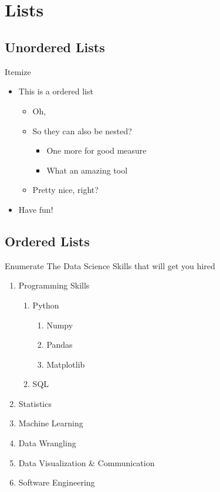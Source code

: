 \documentclass[aspectratio=169,envcountsect]{beamer}    %
\newcommand*{\TocSplit}{9}
\newcommand{\OstToc}[1][]{
	\IfInteger{\TocSplit}
	{
		\tikzmath{integer \nextsection; \nextsection = \TocSplit+1;}
		\begin{columns}[t]
			\begin{column}{0.5\textwidth}
				\tableofcontents[sections=1-\TocSplit, #1]
			\end{column}
			\begin{column}{0.49\textwidth}
				\tableofcontents[sections=\nextsection-, #1]
			\end{column}
		\end{columns}
	}
	{\tableofcontents}
}
\begin{document}
\frame[plain]{\titlepage}

\section*{\contentsname}
\begin{frame}
 \OstToc{}
\end{frame}

\section{Lists}
\subsection{Unordered Lists}
\begin{frame}{Itemize}
 \begin{itemize}
  \item This is a ordered list
        \begin{itemize}
         \item Oh,
         \item So they can also be nested?
               \begin{itemize}
                \item One more for good measure
                \item What an amazing tool
               \end{itemize}
         \item Pretty nice, right?
        \end{itemize}
  \item Have fun!
 \end{itemize}
\end{frame}

\subsection{Ordered Lists}
\begin{frame}{Enumerate}
 The Data Science Skills that will get you hired
 \begin{enumerate}
  \item Programming Skills
        \begin{enumerate}
         \item Python
               \begin{enumerate}
                \item Numpy
                \item Pandas
                \item Matplotlib
               \end{enumerate}
         \item SQL
        \end{enumerate}
  \item Statistics
  \item Machine Learning
  \item Data Wrangling
  \item Data Visualization \& Communication
  \item Software Engineering
 \end{enumerate}
\end{frame}
\end{document}
